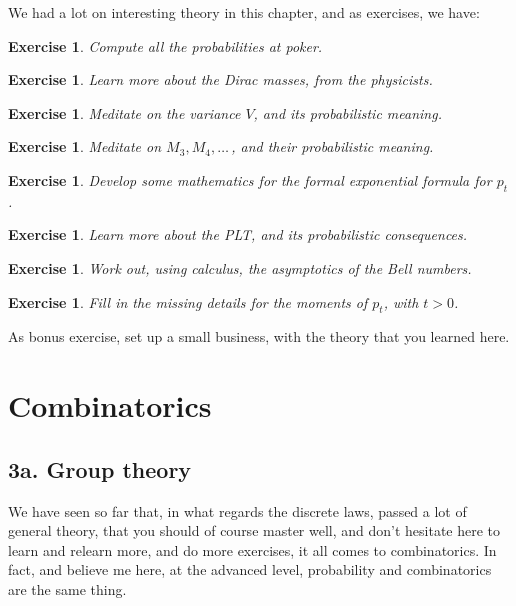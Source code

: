 \documentclass[12pt]{amsbook}
\newtheorem{exercise}[theorem]{Exercise}
\begin{document}
We had a lot on interesting theory in this chapter, and as exercises, we have:

\begin{exercise}
Compute all the probabilities at poker.
\end{exercise}

\begin{exercise}
Learn more about the Dirac masses, from the physicists.
\end{exercise}

\begin{exercise}
Meditate on the variance $V$, and its probabilistic meaning.
\end{exercise}

\begin{exercise}
Meditate on $M_3,M_4,\ldots\,$, and their probabilistic meaning.
\end{exercise}

\begin{exercise}
Develop some mathematics for the formal exponential formula for $p_t$.
\end{exercise}

\begin{exercise}
Learn more about the PLT, and its probabilistic consequences.
\end{exercise}

\begin{exercise}
Work out, using calculus, the asymptotics of the Bell numbers.
\end{exercise}

\begin{exercise}
Fill in the missing details for the moments of $p_t$, with $t>0$.
\end{exercise}

As bonus exercise, set up a small business, with the theory that you learned here.

\chapter{Combinatorics}

\section*{3a. Group theory}

We have seen so far that, in what regards the discrete laws, passed a lot of general theory, that you should of course master well, and don't hesitate here to learn and relearn more, and do more exercises, it all comes to combinatorics. In fact, and believe me here, at the advanced level, probability and combinatorics are the same thing.
\end{document}
